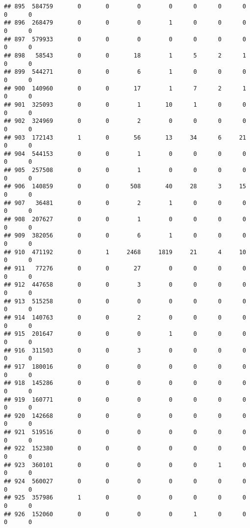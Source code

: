 \documentclass[
]{article}
\begin{document}
\begin{verbatim}
## 895  584759       0       0        0        0      0      0      0     0      0
## 896  268479       0       0        0        1      0      0      0     0      0
## 897  579933       0       0        0        0      0      0      0     0      0
## 898   58543       0       0       18        1      5      2      1     0      0
## 899  544271       0       0        6        1      0      0      0     0      0
## 900  140960       0       0       17        1      7      2      1     0      0
## 901  325093       0       0        1       10      1      0      0     0      0
## 902  324969       0       0        2        0      0      0      0     0      0
## 903  172143       1       0       56       13     34      6     21     0      0
## 904  544153       0       0        1        0      0      0      0     0      0
## 905  257508       0       0        1        0      0      0      0     0      0
## 906  140859       0       0      508       40     28      3     15     0      0
## 907   36481       0       0        2        1      0      0      0     0      0
## 908  207627       0       0        1        0      0      0      0     0      0
## 909  382056       0       0        6        1      0      0      0     0      0
## 910  471192       0       1     2468     1819     21      4     10     0      0
## 911   77276       0       0       27        0      0      0      0     0      0
## 912  447658       0       0        3        0      0      0      0     0      0
## 913  515258       0       0        0        0      0      0      0     0      0
## 914  140763       0       0        2        0      0      0      0     0      0
## 915  201647       0       0        0        1      0      0      0     0      0
## 916  311503       0       0        3        0      0      0      0     0      0
## 917  180016       0       0        0        0      0      0      0     0      0
## 918  145286       0       0        0        0      0      0      0     0      0
## 919  160771       0       0        0        0      0      0      0     0      0
## 920  142668       0       0        0        0      0      0      0     0      0
## 921  519516       0       0        0        0      0      0      0     0      0
## 922  152380       0       0        0        0      0      0      0     0      0
## 923  360101       0       0        0        0      0      1      0     0      0
## 924  560027       0       0        0        0      0      0      0     0      0
## 925  357986       1       0        0        0      0      0      0     0      0
## 926  152060       0       0        0        0      1      0      0     0      0

\end{verbatim}
\end{document}
